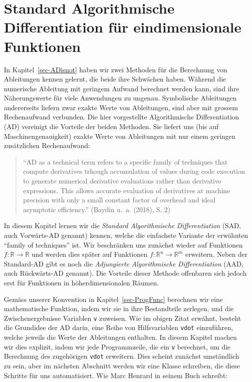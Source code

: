 \documentclass[
  letterpaper,
  DIV=11,
  oneside]{scrreprt}
\theoremstyle{definition}
\theoremstyle{definition}
\theoremstyle{remark}
\begin{document}

\hypertarget{sec-SADforOneDimFunctions}{%
\chapter{Standard Algorithmische Differentiation für eindimensionale
Funktionen}\label{sec-SADforOneDimFunctions}}

In Kapitel~\ref{sec-ADisnot} haben wir zwei Methoden für die Berechnung
von Ableitungen kennen gelernt, die beide ihre Schwächen haben. Während
die numerische Ableitung mit geringem Aufwand berechnet werden kann,
sind ihre Näherungswerte für viele Anwendungen zu ungenau. Symbolische
Ableitungen andererseits liefern zwar exakte Werte von Ableitungen, sind
aber mit grossem Rechenaufwand verbunden. Die hier vorgestellte
Algorithmische Differentiation (AD) vereinigt die Vorteile der beiden
Methoden. Sie liefert uns (bis auf Maschinengenauigkeit) exakte Werte
von Ableitungen mit nur einem geringen zusätzlichen Rechenaufwand:

\begin{quote}
``AD as a technical term refers to a specific family of techniques that
compute derivatives trhough accumulation of values during code execution
to generate numerical derivative evaluations rather than derivative
expressions. This allows accurate evaluation of derivatives at machine
precision with only a small constant factor of overhead and ideal
asymptotic efficiency.'' (Baydin u.~a. (2018), S. 2)
\end{quote}

In diesem Kapitel lernen wir die \emph{Standard Algorithmische
Differentiation} (SAD, auch Vorwärts-AD genannt) kennen, welche die
einfachste Variante der erwähnten ``family of techniques'' ist. Wir
beschränken uns zunächst wieder auf Funktionen
\(f : \mathbb{R} \rightarrow \mathbb{R}\) und werden dies später auf
Funktionen \(f : \mathbb{R}^n \rightarrow \mathbb{R}^m\) erweitern.
Neben der Standard-AD gibt es noch die \emph{Adjungierte Algorithmische
Differentiation} (AAD, auch Rückwärts-AD genannt). Die Vorteile dieser
Methode offenbaren sich jedoch erst für Funktionen in höherdimensionalen
Räumen.

Gemäss unserer Konvention in Kapitel~\ref{sec-ProgFunc} berechnen wir
eine mathematische Funktion, indem wir sie in ihre Bestandteile
zerlegen, und die Zwischenergebnisse Variablen \texttt{v} zuweisen. Wie
im obigen Zitat erwähnt, besteht die Grundidee der AD darin, eine Reihe
von Hilfsvariablen \texttt{vdot} einzuführen, welche jeweils die Werte
der Ableitungen enthalten. In diesem Kapitel machen wir dies explizit,
indem wir jede Programmzeile, die ein \texttt{v} berechnet, um die
Berechnung des zugehörigen \texttt{vdot} erweitern. Dies scheint
zunächst umständlich zu sein, aber im nächsten Abschnitt werden wir eine
Klasse schreiben, die diese Schritte für uns automatisiert. Wie Marc
Henrard in seinem Buch schreibt:
\end{document}
